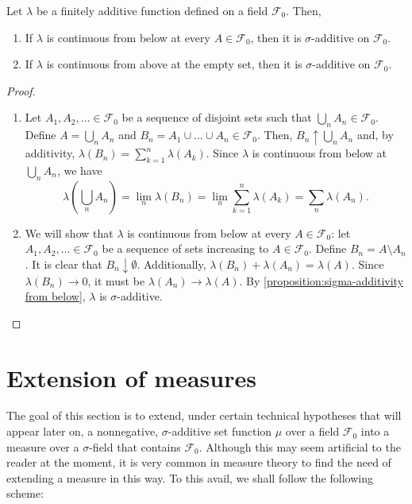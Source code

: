 \begin{prop}\label{proposition:sigma-additivity and limits} Let \(\lambda\) be a finitely additive function defined
on a field \(\mathcal{F}_0\). Then,
		\begin{enumerate}
			\item \label{proposition:sigma-additivity from below} If \(\lambda\)
is continuous from below at every \(A\in\mathcal{F}_0\), then it is
\(\sigma\)-additive on \(\mathcal{F}_0\).
			\item \label{proposition:sigma-additivity from above} If \(\lambda\)
is continuous from above at the empty set, then it is
\(\sigma\)-additive on \(\mathcal{F}_0\).
		\end{enumerate}
\end{prop}
\begin{proof}
		\begin{enumerate}
			\item Let \(A_{1},A_{2},\dotsc\in\mathcal{F}_0\) be a sequence of disjoint sets
such that \(\bigcup_{n}A_{n}\in\mathcal{F}_0\). Define \(A=\bigcup_{n}A_{n}\) and
\(B_{n}=A_{1}\cup\dotsc\cup A_{n}\in\mathcal{F}_0\). Then,
\(B_{n}\uparrow \bigcup_{n}A_{n}\) and, by additivity,
\(\lambda(B_{n})=\sum_{k=1}^{n}\lambda(A_{k})\). Since \(\lambda\) is continuous
from below at \(\bigcup_{n}A_{n}\), we have
			\[ \lambda\left(\bigcup_{n}A_{n}\right)=\lim_{n}\lambda(B_{n})=\lim_{n}\sum_{k=1}^{n}\lambda(A_{k})=\sum_{n}\lambda(A_{n}).
			\]
			\item We will show that \(\lambda\) is continuous from below at
every \(A\in\mathcal{F}_0\): let \(A_{1},A_{2},\dotsc\in\mathcal{F}_0\) be a sequence of sets
increasing to \(A\in\mathcal{F}_0\). Define \(B_{n}=A\setminus A_{n}\). It is clear that
\(B_{n}\downarrow\emptyset\). Additionally,
\(\lambda(B_{n})+\lambda(A_{n})=\lambda(A)\). Since \(\lambda(B_{n})\to0\), it
must be \(\lambda(A_{n})\to\lambda(A)\). By \ref{proposition:sigma-additivity from below}, \(\lambda\) is \(\sigma\)-additive.
		\end{enumerate}
\end{proof}
\section{Extension of measures}\label{section:Extension of measures}

The goal of this section is to extend, under
certain technical hypotheses that will appear later on, a nonnegative,
\(\sigma\)-additive  set function \(\mu\) over a field \(\mathcal{F}_0\) into a measure
over a \(\sigma\)-field that contains \(\mathcal{F}_0\). Although this may seem artificial to the reader at the moment, it is very common in measure theory to find the need of extending a measure in this way. To this avail, we shall follow
the following scheme:

